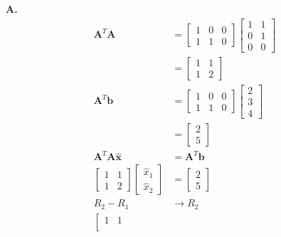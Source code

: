 \documentclass[main.tex]{subfiles}
\begin{document}
\begin{enumerate}
\begin{enumerate}
        \textbf{A.}
        $$
        \begin{aligned}
        \bm{A}^{T} \bm{A} &=\left[\begin{array}{lll}
        1 & 0 & 0 \\
        1 & 1 & 0
        \end{array}\right]\left[\begin{array}{ll}
        1 & 1 \\
        0 & 1 \\
        0 & 0
        \end{array}\right] \\
        &=\left[\begin{array}{ll}
        1 & 1 \\
        1 & 2
        \end{array}\right]\\
        \bm{A}^{T} \bm{b} &=\left[\begin{array}{lll}
        1 & 0 & 0 \\
        1 & 1 & 0
        \end{array}\right]\left[\begin{array}{l}
        2 \\
        3 \\
        4
        \end{array}\right] \\
        &=\left[\begin{array}{l}
        2 \\
        5
        \end{array}\right]\\
        \bm{A}^{T} \bm{A} \widehat{\bm{x}} &= \bm {A}^{T} \bm{b}\\
        \left[\begin{array}{ll}
        1 & 1 \\
        1 & 2
        \end{array}\right]
        \left[\begin{array}{l}
        \hat{x}_{1} \\
        \hat{x}_{2}
        \end{array}\right]&=\left[\begin{array}{l}
        2 \\
        5
        \end{array}\right]\\
        R_2 - R_1 & \rightarrow R_2\\
        \left[\begin{array}{ll}
        1 & 1 \\

\end{array}
\end{aligned}$$
\end{enumerate}
\end{enumerate}
\end{document}
